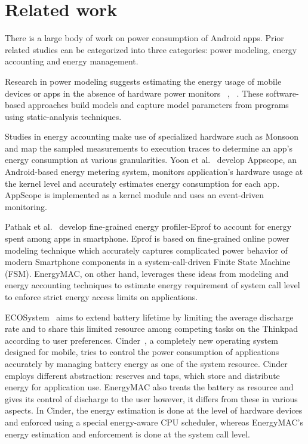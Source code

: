 \section{Related work}
\label{related}


There is a large body of work on power consumption of Android apps. Prior related studies can be categorized into three categories: power modeling, energy accounting and energy management.

Research in power modeling suggests estimating the energy usage of mobile devices or apps in the absence of hardware power
monitors ~\cite{hao2013estimating}, ~\cite{li2013calculating}. These software-based approaches build models and capture model parameters from programs using static-analysis techniques.
 
Studies in energy accounting make use of specialized hardware such as Monsoon and map the sampled measurements to execution traces to determine an app's energy consumption at various granularities. Yoon et al.~\cite{yoon2012appscope} develop Appscope, an Android-based energy metering system, monitors application’s hardware usage at the kernel level and accurately estimates energy consumption for each app. AppScope is implemented as a kernel module and uses an event-driven monitoring. 

Pathak et al.~\cite{pathak2012energy} develop fine-grained energy profiler-Eprof to account for energy spent among apps in smartphone. Eprof is based on fine-grained online power modeling technique which accurately captures complicated power behavior of modern Smartphone components in a system-call-driven Finite State Machine (FSM). EnergyMAC, on other hand, leverages these ideas from modeling and energy accounting techniques to estimate energy requirement of system call level to enforce strict energy access limits on applications.

ECOSystem~\cite{zeng2002ecosystem} aims to extend battery lifetime by limiting the average discharge rate and to share this limited resource among competing tasks on the Thinkpad according to user preferences. Cinder~\cite{roy2011energy}, a completely new operating system designed for mobile, tries to control the power consumption of applications accurately by managing battery energy as one of the system resource. Cinder employs different abstraction: reserves and taps, which store and distribute energy for application use. EnergyMAC also treats the battery as resource and gives its control of discharge  to the user however, it differs from these in various aspects. In Cinder, the energy estimation is done at the level of hardware devices and enforced using a special energy-aware CPU scheduler, whereas EnergyMAC's energy estimation and enforcement is done at the system call level.










